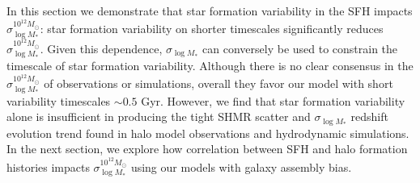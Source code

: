 \documentclass[12pt, letterpaper, preprint, tighten]{aastex62}
\newcommand{\edt}[1]{{\color{dred}{\bf} #1}}
\newcommand{\siglogm}{\sigma_{\log M_*}}
\begin{document}
\edt{In this section we demonstrate that star formation variability in the SFH impacts
$\siglogm^{10^{12}M_\odot}$: star formation variability on shorter timescales significantly 
reduces $\siglogm^{10^{12}M_\odot}$. Given this dependence, $\siglogm$ can conversely be used to constrain
the timescale of star formation variability. Although there is no clear consensus in 
the $\siglogm^{10^{12}M_\odot}$ of observations or simulations, overall they favor our model with short 
variability timescales $\sim0.5$ Gyr. However, we find that star formation variability 
alone is insufficient in producing the tight SHMR scatter and $\siglogm$ redshift evolution 
trend found in halo model observations and hydrodynamic simulations. In the next section, 
we explore how correlation between SFH and halo formation histories impacts $\siglogm^{10^{12}M_\odot}$
using our models with galaxy assembly bias.
}
\end{document}
